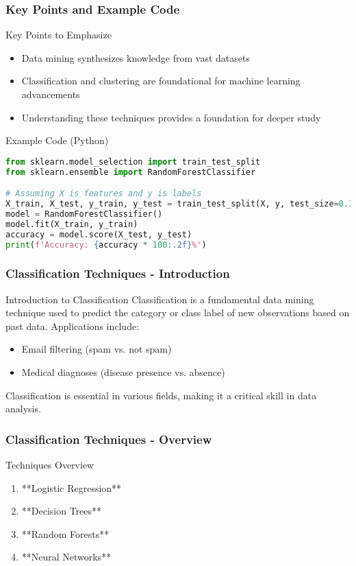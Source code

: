 \documentclass[aspectratio=169]{beamer}
\begin{document}
\begin{frame}[fragile]
    \frametitle{Key Points and Example Code}
    \begin{block}{Key Points to Emphasize}
        \begin{itemize}
            \item Data mining synthesizes knowledge from vast datasets
            \item Classification and clustering are foundational for machine learning advancements
            \item Understanding these techniques provides a foundation for deeper study
        \end{itemize}
    \end{block}

    \begin{block}{Example Code (Python)}
        \begin{lstlisting}[language=Python]
from sklearn.model_selection import train_test_split
from sklearn.ensemble import RandomForestClassifier

# Assuming X is features and y is labels
X_train, X_test, y_train, y_test = train_test_split(X, y, test_size=0.3)
model = RandomForestClassifier()
model.fit(X_train, y_train)
accuracy = model.score(X_test, y_test)
print(f'Accuracy: {accuracy * 100:.2f}%')
        \end{lstlisting}
    \end{block}
\end{frame}

\begin{frame}[fragile]
    \frametitle{Classification Techniques - Introduction}
    \begin{block}{Introduction to Classification}
        Classification is a fundamental data mining technique used to predict the category or class label of new observations based on past data. Applications include:
        \begin{itemize}
            \item Email filtering (spam vs. not spam)
            \item Medical diagnoses (disease presence vs. absence)
        \end{itemize}
        Classification is essential in various fields, making it a critical skill in data analysis.
    \end{block}
\end{frame}

\begin{frame}[fragile]
    \frametitle{Classification Techniques - Overview}
    \begin{block}{Techniques Overview}
        \begin{enumerate}
            \item **Logistic Regression**
            \item **Decision Trees**
            \item **Random Forests**
            \item **Neural Networks**
        \end{enumerate}
    \end{block}
\end{frame}
\end{document}
